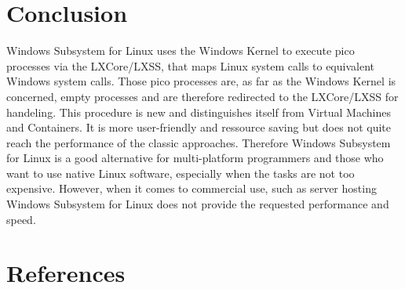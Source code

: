 \documentclass[utf8,biblatex, ngerman, english]{lni}
\begin{document}
\section{Conclusion}
Windows Subsystem for Linux uses the Windows Kernel to execute pico processes via the LXCore/LXSS, that maps Linux system calls to equivalent Windows system calls. Those pico processes are, as far as the Windows Kernel is concerned, empty processes and are therefore redirected to the LXCore/LXSS for handeling. This procedure is new and distinguishes itself from Virtual Machines and Containers. It is more user-friendly and ressource saving but does not quite reach the performance of the classic approaches. Therefore Windows Subsystem for Linux is a good alternative for multi-platform programmers and those who want to use native Linux software, especially when the tasks are not too expensive. However, when it comes to commercial use, such as server hosting Windows Subsystem for Linux does not provide the requested performance and speed.

\newpage
\section{References}
\printbibliography
\end{document}
